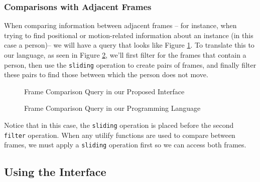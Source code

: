 \subsubsection{Comparisons with Adjacent Frames}
When comparing information between adjacent frames -- for instance, when trying to find positional or motion-related information about an instance (in this case a person)-- we will have a query that looks like Figure \ref{fig:Comp1}. To translate this to our language, as seen in Figure \ref{fig:Comp2}, we'll first filter for the frames that contain a person, then use the \texttt{sliding} operation to create pairs of frames, and finally filter these pairs to find those between which the person does not move. 

\begin{figure}[H]
    \caption{Frame Comparison Query in our Proposed Interface}
    \label{fig:Comp1}
\end{figure}

\begin{figure}[H]
    \caption{Frame Comparison Query in our Programming Language}
    \label{fig:Comp2}
\end{figure}

Notice that in this case, the \texttt{sliding} operation is placed before the second \texttt{filter} operation. When any utilify functions are used to compare between frames, we must apply a  \texttt{sliding} operation first so we can access both frames.

\subsection{Using the Interface}

